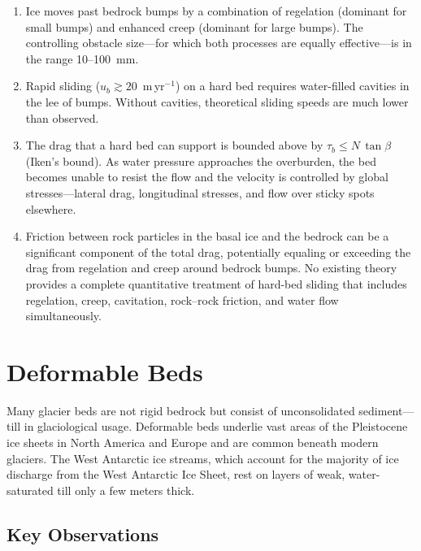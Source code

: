 \documentclass[11pt]{article}
\begin{document}
\begin{enumerate}
  \item Ice moves past bedrock bumps by a combination of regelation (dominant for small bumps) and enhanced creep (dominant for large bumps).  The controlling obstacle size---for which both processes are equally effective---is in the range 10--100~mm.

  \item Rapid sliding ($u_b \gtrsim 20$~m\,yr$^{-1}$) on a hard bed requires water-filled cavities in the lee of bumps.  Without cavities, theoretical sliding speeds are much lower than observed.

  \item The drag that a hard bed can support is bounded above by $\tau_b \leq N\,\tan\beta$ (Iken's bound).  As water pressure approaches the overburden, the bed becomes unable to resist the flow and the velocity is controlled by global stresses---lateral drag, longitudinal stresses, and flow over sticky spots elsewhere.

  \item Friction between rock particles in the basal ice and the bedrock can be a significant component of the total drag, potentially equaling or exceeding the drag from regelation and creep around bedrock bumps.  No existing theory provides a complete quantitative treatment of hard-bed sliding that includes regelation, creep, cavitation, rock--rock friction, and water flow simultaneously.
\end{enumerate}

\section{Deformable Beds}
\label{sec:soft_bed}

Many glacier beds are not rigid bedrock but consist of unconsolidated sediment---till in glaciological usage.  Deformable beds underlie vast areas of the Pleistocene ice sheets in North America and Europe and are common beneath modern glaciers.  The West Antarctic ice streams, which account for the majority of ice discharge from the West Antarctic Ice Sheet, rest on layers of weak, water-saturated till only a few meters thick.

\subsection{Key Observations}
\end{document}
